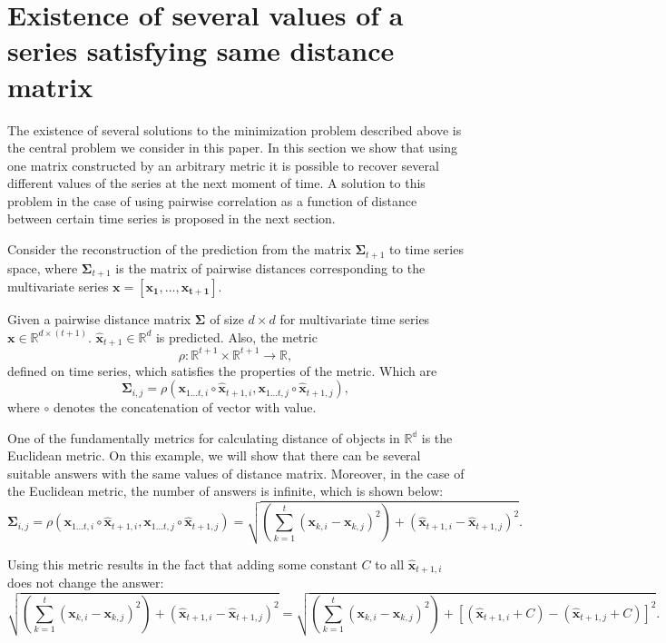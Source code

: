 \documentclass{article}
\begin{document}
\section{Existence of several values of a series satisfying same distance matrix}

The existence of several solutions to the minimization problem described above is the central problem we consider in this paper. In this section we show that using one matrix constructed by an arbitrary metric it is possible to recover several different values of the series at the next moment of time. A solution to this problem in the case of using pairwise correlation as a function of distance between certain time series is proposed in the next section.

Consider the reconstruction of the prediction from the matrix $\mathbf{\Sigma}_{t+1}$ to time series space, where $\mathbf{\Sigma}_{t+1}$ is the matrix of pairwise distances corresponding to the multivariate series $\mathbf{x}=[\mathbf{x_1}, \ldots, \mathbf{x_{t+1}}]$.

Given a pairwise distance matrix $\mathbf{\Sigma}$ of size $d \times d$ for multivariate time series $\mathbf{x} \in \mathbb{R}^{d \times (t+1)}$. $\hat{\mathbf{x}}_{t+1} \in \mathbb{R}^d$ is predicted. Also, the metric \[ \rho : \mathbb{R}^{t+1} \times \mathbb{R}^{t+1} \rightarrow \mathbb{R}, \] defined on time series, which satisfies the properties of the metric. Which are \[\mathbf{\Sigma}_{i,j} = \rho(\mathbf{x}_{1 \ldots t, i} \circ \hat{\mathbf{x}}_{t+1, i}, \mathbf{x}_{1 \ldots t, j} \circ \hat{\mathbf{x}}_{t+1, j}),\] where $\circ$ denotes the concatenation of vector with value.

One of the fundamentally metrics for calculating distance of objects in $\mathbb{R^d}$ is the Euclidean metric. On this example, we will show that there can be several suitable answers with the same values of distance matrix. Moreover, in the case of the Euclidean metric, the number of answers is infinite, which is shown below:
\[\mathbf{\Sigma}_{i,j} = \rho(\mathbf{x}_{1 \ldots t, i} \circ \hat{\mathbf{x}}_{t+1, i}, \mathbf{x}_{1 \ldots t, j} \circ \hat{\mathbf{x}}_{t+1, j})=\sqrt{\left(\sum_{k=1}^t (\mathbf{x}_{k,i}-\mathbf{x}_{k,j})^2\right) + (\hat{\mathbf{x}}_{t+1, i}-\hat{\mathbf{x}}_{t+1, j})^2}.\]

Using this metric results in the fact that adding some constant $C$ to all $\hat{\mathbf{x}}_{t+1, i}$ does not change the answer:
\[
\sqrt{\left(\sum_{k=1}^t (\mathbf{x}_{k,i}-\mathbf{x}_{k,j})^2\right) + (\hat{\mathbf{x}}_{t+1, i}-\hat{\mathbf{x}}_{t+1, j})^2} = \sqrt{\left(\sum_{k=1}^t (\mathbf{x}_{k,i}-\mathbf{x}_{k,j})^2\right) + [(\hat{\mathbf{x}}_{t+1, i} + C) -(\hat{\mathbf{x}}_{t+1, j} + C)]^2}.
\]
\end{document}
